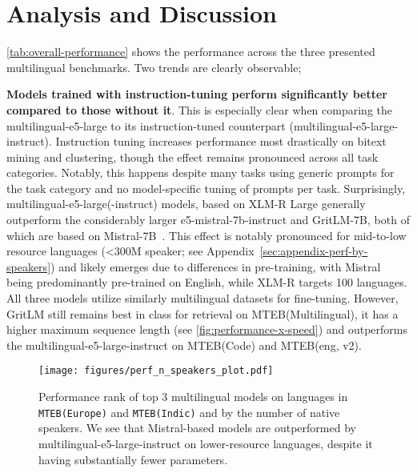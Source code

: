 \section{Analysis and Discussion}

\autoref{tab:overall-performance} shows the performance across the three presented multilingual benchmarks.
Two trends are clearly observable;  

\textbf{Models trained with instruction-tuning perform significantly better compared to those without it}. This is especially clear when comparing the multilingual-e5-large to its instruction-tuned counterpart (multilingual-e5-large-instruct). Instruction tuning increases performance most drastically on bitext mining and clustering, though the effect remains pronounced across all task categories. Notably, this happens despite many tasks using generic prompts for the task category and no model-specific tuning of prompts per task.
Surprisingly, multilingual-e5-large(-instruct) models, based on XLM-R Large \citep{conneau2019unsupervised} generally outperform the considerably larger e5-mistral-7b-instruct and GritLM-7B, both of which are based on Mistral-7B~\citep{jiang2023mistral}. 
This effect is notably pronounced for mid-to-low resource languages (<300M speaker; see Appendix~\ref{sec:appendix-perf-by-speakers}) and likely emerges due to differences in pre-training, with Mistral being predominantly pre-trained on English, while XLM-R targets 100 languages. All three models utilize similarly multilingual datasets for fine-tuning.  However, GritLM still remains best in class for retrieval on MTEB(Multilingual), it has a higher maximum sequence length (see \autoref{fig:performance-x-speed}) and outperforms the multilingual-e5-large-instruct on MTEB(Code) and MTEB(eng, v2).



\begin{figure}
    \centering
    \texttt{[image: figures/perf\_n\_speakers\_plot.pdf]}
    \caption{Performance rank of top 3 multilingual models on languages in \texttt{MTEB(Europe)} and \texttt{MTEB(Indic)} and by the number of native speakers.
    We see that Mistral-based models are outperformed by multilingual-e5-large-instruct on lower-resource languages, despite it having substantially fewer parameters.
    }
    \label{fig:perf_per_speakers}
\end{figure}

